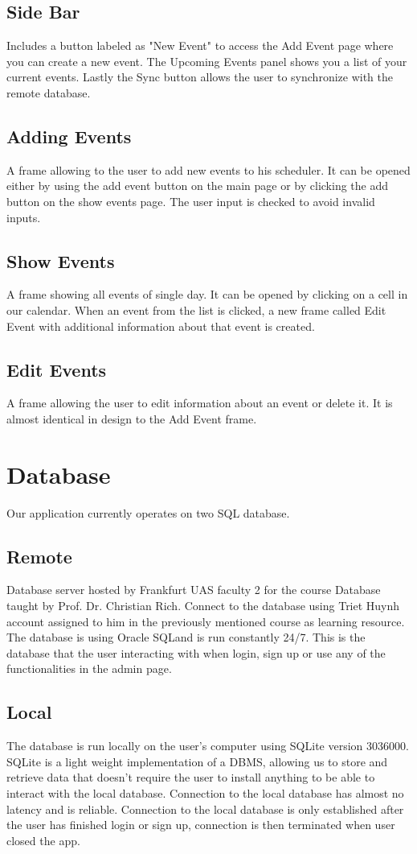 \subsection{Side Bar}
Includes a button labeled as "New Event" to access the Add Event page where you can create a new event. The Upcoming Events panel shows you a list of your current events. Lastly the Sync button allows the user to synchronize with the remote database.
\subsection{Adding Events}
A frame allowing to the user to add new events to his scheduler. It can be opened either by using the add event button on the main page or by clicking the add button on the show events page. The user input is checked to avoid invalid inputs.
\subsection{Show Events}
A frame showing all events of single day. It can be opened by clicking on a cell in our calendar. When
an event from the list is clicked, a new frame called Edit Event with additional information about that event is created.
\subsection{Edit Events}
A frame allowing the user to edit information about an event or delete it. It is almost identical in design to the Add Event frame.
\section{Database}
Our application currently operates on two SQL database.
\subsection{Remote}
Database server hosted by Frankfurt UAS faculty 2 for the course Database taught by Prof. Dr. Christian Rich. Connect to the
database using Triet Huynh account assigned to him in the previously mentioned course as learning resource. The database
is using Oracle SQL\texttrademark  and is run constantly 24/7. This is the database that the user interacting with when login,
sign up or use any of the functionalities in the admin page. 

\subsection{Local}
The database is run locally on the user's computer using SQLite version 3036000. SQLite is a light weight implementation of a
DBMS, allowing us to store and retrieve data that doesn't require the user to install anything to be able to interact with the local database. Connection to the local database has almost no latency and is reliable. 
Connection to the local database is only established after the user has finished login or sign up, connection is then terminated when user closed the app.

